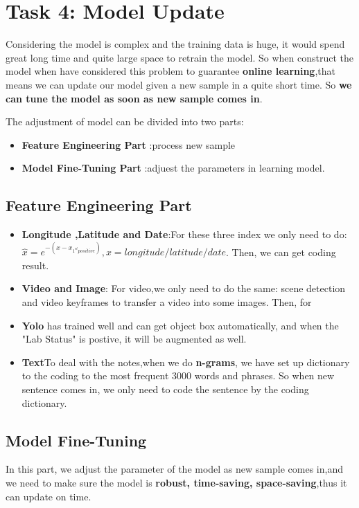 \documentclass[12pt]{article}
\begin{document}
\section{Task 4: Model Update}
Considering the model is complex and the training data is huge, it would spend great long time and quite large space to retrain the model. So when construct the model when have considered this problem to guarantee \textbf{online learning},that means we can update our model given a new sample in a quite short time. So \textbf{we can tune the model as soon as new sample comes in}.

The adjustment of model can be divided into two parts:
\begin{itemize}
	\item \textbf{Feature Engineering Part} :process new sample
	\item \textbf{Model Fine-Tuning Part} :adjuest the parameters in learning model.
\end{itemize}
\subsection{Feature Engineering Part}
\begin{itemize}
	\item \textbf{Longitude ,Latitude and Date}:For these three index we only need to do: $\hat{x}=e^{-(x-x_{1^{st}positive})},x=longitude/latitude/date$. Then, we can get coding result.
	\item \textbf{Video and Image}: For video,we only need to do the same: scene detection and video keyframes to transfer a video into some images. Then, for
	\item \textbf{Yolo} has trained well and can get object box automatically, and when the "Lab Status" is postive, it will be augmented as well.
	\item \textbf{Text}To deal with the notes,when we do \textbf{n-grams}, we have set up dictionary to the coding to the most frequent 3000 words and phrases. So when new sentence comes in, we only need to code the sentence by the coding dictionary.
\end{itemize}


\subsection{Model Fine-Tuning}
In this part, we adjust the parameter of the model as new sample comes in,and we need to make sure the model is \textbf{robust, time-saving, space-saving},thus it can update on time.
\end{document}
